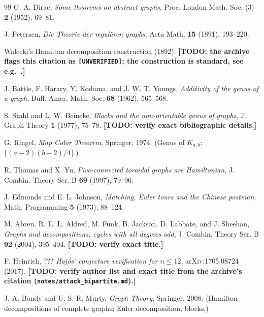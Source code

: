 \documentclass[a4paper,11pt]{amsart}
\theoremstyle{definition}
\theoremstyle{remark}
\newcommand{\TODO}[1]{\textbf{[TODO: #1]}}
\begin{document}
\begin{thebibliography}{99}
 G. A. Dirac, \emph{Some theorems on abstract graphs}, Proc. London Math. Soc. (3) \textbf{2}
(1952), 69--81.

 J. Petersen, \emph{Die Theorie der regul\"aren graphs}, Acta Math. \textbf{15} (1891),
193--220.

 Walecki's Hamilton decomposition construction (1892). \TODO{the archive flags this citation
as \texttt{[UNVERIFIED]}; the construction is standard, see e.g.\ \cite{BM08}.}

 J. Battle, F. Harary, Y. Kodama, and J. W. T. Youngs, \emph{Additivity of the genus of a
graph}, Bull. Amer. Math. Soc. \textbf{68} (1962), 565--568.

 S. Stahl and L. W. Beineke, \emph{Blocks and the non-orientable genus of graphs}, J. Graph
Theory \textbf{1} (1977), 75--78. \TODO{verify exact bibliographic details.}

 G. Ringel, \emph{Map Color Theorem}, Springer, 1974. (Genus of $K_{a,b}$:
$\lceil(a-2)(b-2)/4\rceil$.)

 R. Thomas and X. Yu, \emph{Five-connected toroidal graphs are Hamiltonian}, J. Combin.
Theory Ser. B \textbf{69} (1997), 79--96.

 J. Edmonds and E. L. Johnson, \emph{Matching, Euler tours and the Chinese postman}, Math.
Programming \textbf{5} (1973), 88--124.

 M. Abreu, R. E. L. Aldred, M. Funk, B. Jackson, D. Labbate, and J. Sheehan,
\emph{Graphs and decompositions: cycles with all degrees odd}, J. Combin. Theory Ser. B \textbf{92} (2004),
395--404. \TODO{verify exact title.}

 F. Heinrich, ??? \emph{Haj\'os' conjecture verification for $n\le12$}, arXiv:1705.08724
(2017). \TODO{verify author list and exact title from the archive's citation
(\texttt{notes/attack\_bipartite.md}).}

 J. A. Bondy and U. S. R. Murty, \emph{Graph Theory}, Springer, 2008. (Hamilton
decompositions of complete graphs; Euler decomposition; blocks.)

\end{thebibliography}
\end{document}
